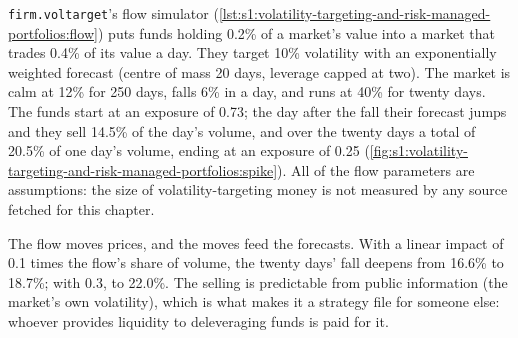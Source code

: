 \texttt{firm.voltarget}'s flow simulator (\cref{lst:s1:volatility-targeting-and-risk-managed-portfolios:flow}) puts funds holding 0.2\% of a market's
value into a market that trades 0.4\% of its value a day. They target 10\% volatility with an exponentially weighted forecast (centre of mass 20 days,
leverage capped at two). The market is calm at 12\% for 250 days, falls 6\% in a day, and runs at 40\% for twenty days. The funds start at an exposure
of 0.73; the day after the fall their forecast jumps and they sell 14.5\% of the day's volume, and over the twenty days a total of 20.5\% of one day's
volume, ending at an exposure of 0.25 (\cref{fig:s1:volatility-targeting-and-risk-managed-portfolios:spike}). All of the flow parameters are assumptions:
the size of volatility-targeting money is not measured by any source fetched for this chapter.

\begin{omfigure}

\label{fig:s1:volatility-targeting-and-risk-managed-portfolios:spike}
\end{omfigure}

The flow moves prices, and the moves feed the forecasts. With a linear impact of 0.1 times the flow's share of volume, the twenty days' fall deepens
from 16.6\% to 18.7\%; with 0.3, to 22.0\%. The selling is predictable from public information (the market's own volatility), which is what makes it
a strategy file for someone else: whoever provides liquidity to deleveraging funds is paid for it.


